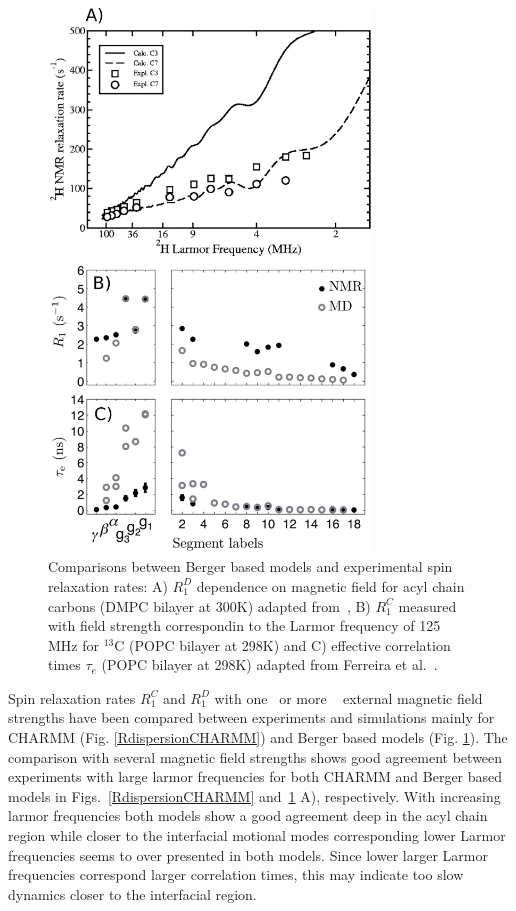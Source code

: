 \documentclass[aps,prl,superscriptaddress,twocolumn]{revtex4}
\begin{document}
\begin{figure}[]
  \includegraphics[width=8.6cm]{../Fig/RandEFFCT.eps}
\newline
  \caption{\label{RandEFFCT}
    Comparisons between Berger based models and experimental spin relaxation rates:
    A) $R_1^{D}$ dependence on magnetic field for acyl chain carbons (DMPC bilayer at 300K) adapted from~\cite{wohlert06},
    B) $R_1^{C}$ measured with field strength correspondin to the Larmor frequency of 125 MHz for $^{13}$C (POPC bilayer at 298K) and
    C) effective correlation times $\tau_e$ (POPC bilayer at 298K) adapted from Ferreira et al.~\cite{ferreira15}.
  } 
\end{figure}
Spin relaxation rates $R_1^{C}$ and $R_1^{D}$ with one~\cite{feller02,eldho03,ollila07a,klauda08b,ferreira15} 
or more ~\cite{pastor88,lindahl01,pastor02,klauda08a,klauda08b,wohlert06,klauda12} external magnetic field 
strengths have been compared between experiments and simulations mainly for CHARMM (Fig. \ref{RdispersionCHARMM}) 
and Berger based models (Fig. \ref{RandEFFCT}). The comparison with several
magnetic field strengths shows good agreement between experiments with large larmor frequencies 
for both CHARMM and Berger based models in Figs.~\ref{RdispersionCHARMM} and~\ref{RandEFFCT} A), respectively.
With increasing larmor frequencies both models show a good agreement deep in the acyl chain region
while closer to the interfacial motional modes corresponding lower Larmor frequencies seems to over presented
in both models. Since lower larger Larmor frequencies correspond larger correlation times, this may
indicate too slow dynamics closer to the interfacial region. 
\end{document}
